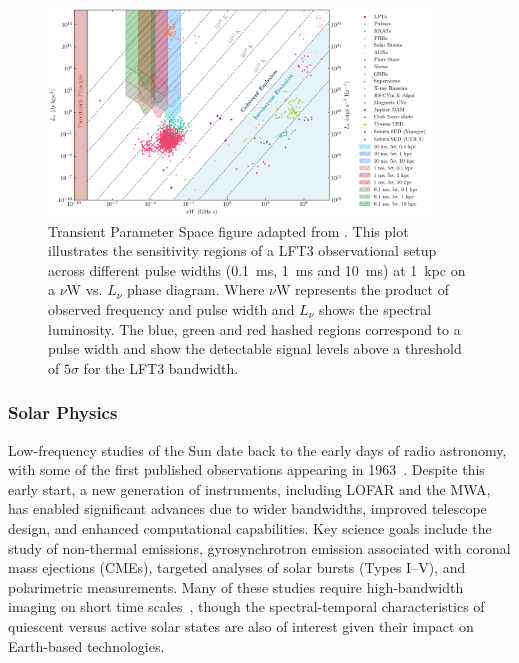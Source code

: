 \begin{figure}[!ht]
    \centering
    \includegraphics[width=0.9\textwidth]{figures/phase_space.png} 
    \caption{Transient Parameter Space figure adapted from \citet{pietka}. This plot illustrates the sensitivity regions of a LFT3 observational setup across different pulse widths (0.1~ms, 1~ms and 10~ms) at 1~kpc on a $\nu \text{W}$ vs. $L_\nu$ phase diagram. Where $\nu \text{W}$ represents the product of observed frequency and pulse width and $L_\nu$ shows the spectral luminosity. The blue, green and red hashed regions correspond to a pulse width and show the detectable signal levels above a threshold of $5\sigma$ for the LFT3 bandwidth.}
    \label{fig:transient_space}
\end{figure}







\subsubsection{Solar Physics}
Low-frequency studies of the Sun date back to the early days of radio astronomy, with some of the first published observations appearing in 1963~\citep{Wild_1963}. Despite this early start, a new generation of instruments, including LOFAR and the MWA, has enabled significant advances due to wider bandwidths, improved telescope design, and enhanced computational capabilities. Key science goals include the study of non-thermal emissions, gyrosynchrotron emission associated with coronal mass ejections (CMEs), targeted analyses of solar bursts (Types I--V), and polarimetric measurements. Many of these studies require high-bandwidth imaging on short time scales~\citep{Kansabanik_2022}, though the spectral-temporal characteristics of quiescent versus active solar states are also of interest given their impact on Earth-based technologies.


